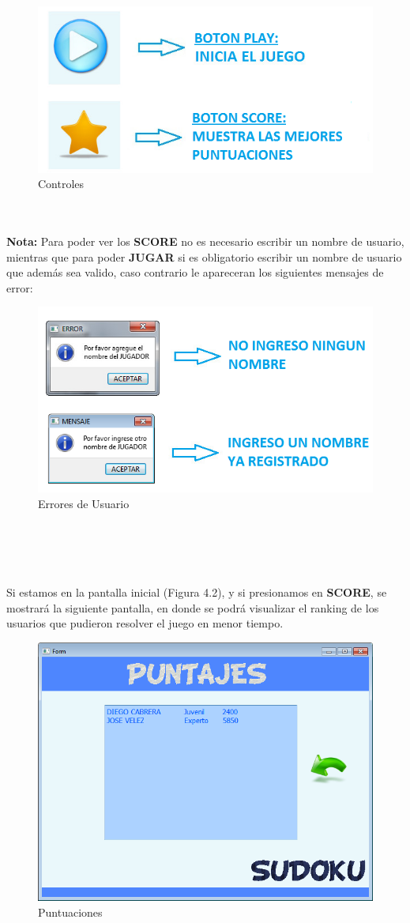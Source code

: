 \begin{figure}[htbp]
\begin{center}
\includegraphics[width=.60\textwidth]{./imagenes/Controles.png}
\caption{Controles}
\label{Controles}
\end{center}
\end{figure} 

\ \\ \ \\
\textbf{Nota:} Para poder ver los \textbf{SCORE} no es necesario escribir un nombre de usuario, mientras que para poder \textbf{JUGAR} si es obligatorio escribir un nombre de usuario que además sea valido, caso contrario le apareceran los siguientes mensajes de error:

\begin{figure}[htbp]
\begin{center}
\includegraphics[width=.60\textwidth]{./imagenes/ErrorNoJugador.png}
\caption{Errores de Usuario}
\label{Errores de Usuario}
\end{center}
\end{figure} 

\ \\ \ \\ \ \\ \ \\
Si estamos en la pantalla inicial (Figura 4.2), y si presionamos en \textbf{SCORE}, se mostrará la siguiente pantalla, en donde se podrá visualizar el ranking de los usuarios que pudieron resolver el juego en menor tiempo. 
 
\begin{figure}[htbp]
\begin{center}
\includegraphics[width=.40\textwidth]{./imagenes/Puntajes3.png}
\caption{Puntuaciones}
\label{Puntuaciones}
\end{center}
\end{figure} 


